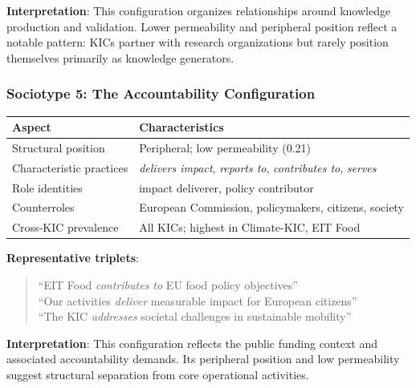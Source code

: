 \documentclass[../main.tex]{subfiles}
\begin{document}
\textbf{Interpretation}: This configuration organizes relationships around knowledge production and validation. Lower permeability and peripheral position reflect a notable pattern: KICs partner with research organizations but rarely position themselves primarily as knowledge generators.

\subsubsection{Sociotype 5: The Accountability Configuration}

\begin{center}
\small
\begin{tabular}{ll}
\toprule
\textbf{Aspect} & \textbf{Characteristics} \\
\midrule
Structural position & Peripheral; low permeability (0.21) \\
Characteristic practices & \textit{delivers impact}, \textit{reports to}, \textit{contributes to}, \textit{serves} \\
Role identities & impact deliverer, policy contributor \\
Counterroles & European Commission, policymakers, citizens, society \\
Cross-KIC prevalence & All KICs; highest in Climate-KIC, EIT Food \\
\bottomrule
\end{tabular}
\end{center}

\textbf{Representative triplets}:
\begin{quote}
\small
``EIT Food \textit{contributes to} EU food policy objectives''\\
``Our activities \textit{deliver} measurable impact for European citizens''\\
``The KIC \textit{addresses} societal challenges in sustainable mobility''
\end{quote}

\textbf{Interpretation}: This configuration reflects the public funding context and associated accountability demands. Its peripheral position and low permeability suggest structural separation from core operational activities.
\end{document}
